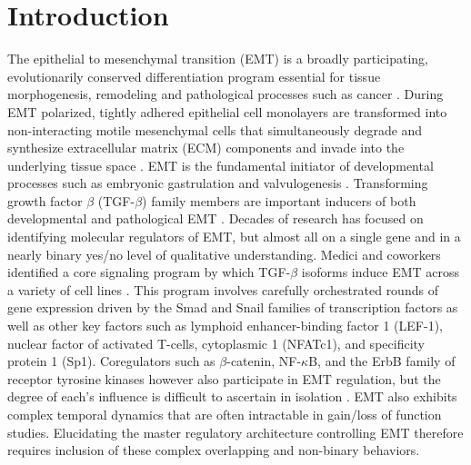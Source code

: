 \documentclass[11pt,letterpaper]{article}
\begin{document}
\section*{Introduction}
The epithelial to mesenchymal transition (EMT) is a broadly participating, evolutionarily conserved differentiation program essential for tissue morphogenesis, remodeling and pathological processes such as cancer \cite{Thiery:2003il}. During EMT polarized, tightly adhered epithelial cell monolayers are transformed into non-interacting motile mesenchymal cells that simultaneously degrade and synthesize extracellular matrix (ECM) components and invade into the underlying tissue space \cite{Stahl:2001pd}. EMT is the fundamental initiator of developmental processes such as embryonic gastrulation and valvulogenesis \cite{Eisenberg:1995ai}. Transforming growth factor $\beta$ (TGF-$\beta$) family members are important inducers of both developmental and pathological EMT \cite{Zavadil:2005fu,Xu:2009oq}. Decades of research has focused on identifying molecular regulators of EMT, but almost all on a single gene and in a nearly binary yes/no level of qualitative understanding. Medici and coworkers identified a core signaling program by which
TGF-$\beta$ isoforms induce EMT across a variety of cell lines \cite{Medici:2006qa,Medici:2008fk}.
This program involves carefully orchestrated rounds of gene expression driven by the Smad and Snail families of transcription factors as well as
other key factors such as lymphoid enhancer-binding factor 1 (LEF-1), nuclear factor of activated T-cells, cytoplasmic 1 (NFATc1), and specificity protein 1 (Sp1).
Coregulators such as $\beta$-catenin, NF-$\kappa$B, and the ErbB family of receptor tyrosine kinases however also participate in EMT regulation, but the degree of each's influence is difficult to ascertain in isolation \cite{Kim:2002lh,Jiang:2007aa,Huber:2004aa,Hardy:2010aa}.
EMT also exhibits complex temporal dynamics that are often intractable in gain/loss of function studies.
Elucidating the master regulatory architecture controlling EMT therefore requires inclusion of these complex overlapping and non-binary behaviors.
\end{document}
